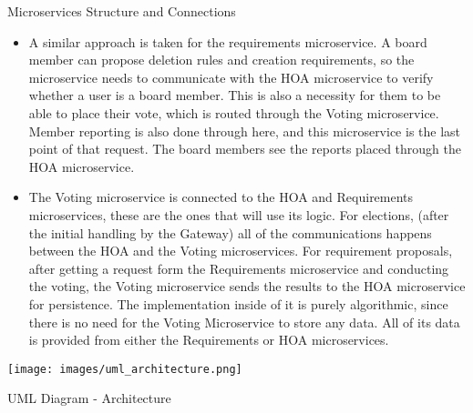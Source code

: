 \documentclass{article}
\begin{document}
\begin{section}{Microservices Structure and Connections}
\begin{itemize}
	\item A similar approach is taken for the requirements microservice. A board member can propose deletion rules and creation requirements, so the microservice needs to communicate with the HOA microservice to verify whether a user is a board member. This is also a necessity for them to be able to place their vote, which is routed through the Voting microservice. Member reporting is also done through here, and this microservice is the last point of that request. The board members see the reports placed through the HOA microservice.
	\item The Voting microservice is connected to the HOA and Requirements microservices, these are the ones that will use its logic. For elections, (after the initial handling by the Gateway) all of the communications happens between the HOA and the Voting microservices. For requirement proposals, after getting a request form the Requirements microservice and conducting the voting, the Voting microservice sends the results to the HOA microservice for persistence. The implementation inside of it is purely algorithmic, since there is no need for the Voting Microservice to store any data. All of its data is provided from either the Requirements or HOA microservices.
    \end{itemize}

\end{section}
\begin{center}
    \texttt{[image: images/uml\_architecture.png]}
    \caption{UML Diagram - Architecture}
\end{center}
\end{document}
